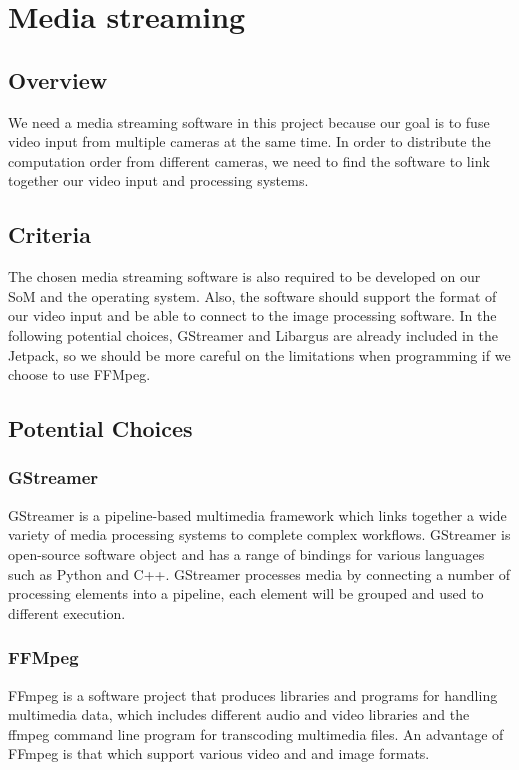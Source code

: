 \documentclass[letterpaper,10pt,serif,draftclsnofoot,onecolumn,compsoc,titlepage]{IEEEtran}
\begin{document}
\section{Media streaming}
\subsection{Overview}
We need a media streaming software in this project because our goal is to fuse video input 
from multiple cameras at the same time. In order to distribute the computation order from 
different cameras, we need to find the software to link together our video input and processing 
systems. \\

\subsection{Criteria}
The chosen media streaming software is also required to be developed on our SoM and the operating 
system. Also, the software should support the format of our video input and be able to connect to 
the image processing software. In the following potential choices, GStreamer and Libargus are 
already included in the Jetpack, so we should be more careful on the limitations when programming 
if we choose to use FFMpeg. \\

\subsection{Potential Choices}
\subsubsection{GStreamer}
GStreamer is a pipeline-based multimedia framework which links together a wide variety of media processing systems to complete complex workflows. GStreamer is open-source software object and has
 a range of bindings for various languages such as Python and C++. GStreamer processes media
  by connecting a number of processing elements into a pipeline, each element will be grouped and 
  used to different execution.\\

\subsubsection{FFMpeg}
FFmpeg is a software project that produces libraries and programs for handling multimedia data, 
which includes different audio and video libraries and the ffmpeg command line program for 
transcoding multimedia files. An advantage of FFmpeg is that which support various video and 
and image formats.\\
\end{document}
